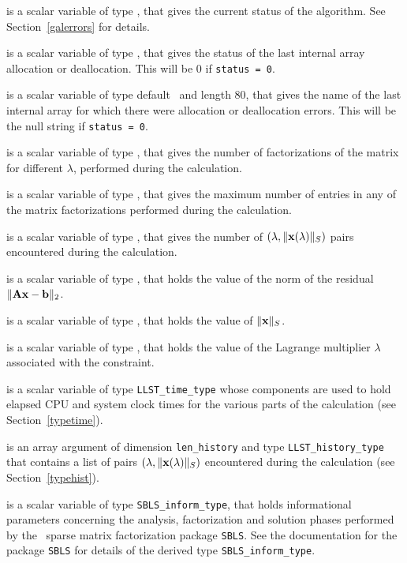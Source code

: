 \documentclass{galahad}
\newcommand{\packagename}{LLST}
\begin{document}
\begin{description}
 is a scalar variable of type \integer, that gives the
current status of the algorithm. See Section~\ref{galerrors} for details.

 is a scalar variable of type \integer,
that gives the status of the last internal array allocation
or deallocation. This will be 0 if {\tt status = 0}.

 is a scalar variable of type default \character\
and length 80, that  gives the name of the last internal array
for which there were allocation or deallocation errors.
This will be the null string if {\tt status = 0}.

 is a scalar variable of type \integer, that
gives the number of factorizations of the matrix \req{kkt}
for different $\lambda$, performed during the calculation.

 is a scalar variable of type \integer, that
gives the maximum number of entries in any of the matrix factorizations
performed during the calculation.

 is a scalar variable of type \integer, that gives
the number of $(\lambda,\|{\mathbf{x}}(\lambda)\|_S)$ pairs encountered during the
calculation.

 is a scalar variable of type \realdp, that holds the
value of the norm of the residual $\| {\mathbf{A}} {\mathbf{x}} - {\mathbf{b}}\|_2$.

 is a scalar variable of type \realdp,
that holds the value of $\|{\mathbf{x}}\|_S$.

 is a scalar variable of type \realdp, that holds the
value of the Lagrange multiplier $\lambda$ associated with the constraint.

 is a scalar variable of type {\tt \packagename\_time\_type}
whose components are used to hold elapsed CPU  and system clock times for the
various parts of the calculation (see Section~\ref{typetime}).

 is an array argument of dimension {\tt len\_history} and
type {\tt \packagename\_history\_type} that contains a list of pairs
$(\lambda,\|{\mathbf{x}}(\lambda)\|_S)$ encountered during the
calculation (see Section~\ref{typehist}).

 is a scalar variable of type {\tt SBLS\_inform\_type},
that holds informational parameters concerning the analysis, factorization
and solution phases performed by
the \galahad\ sparse matrix factorization package {\tt SBLS}.
See the documentation for the package {\tt SBLS} for details of the
derived type {\tt SBLS\_inform\_type}.


\end{description}
\end{document}
